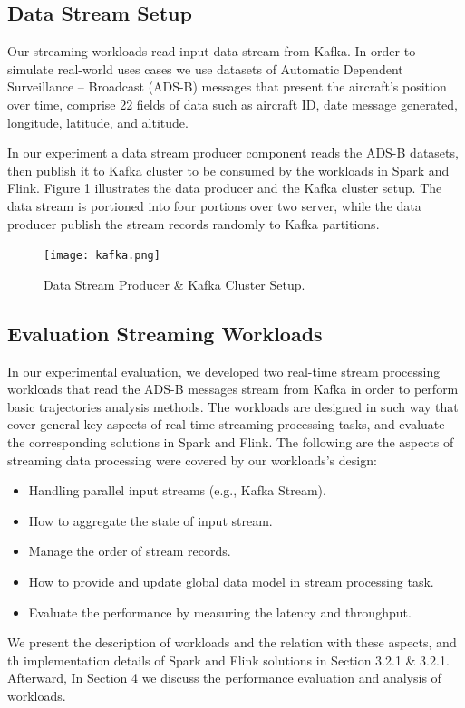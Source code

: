 \documentclass[]{article}
\begin{document}
\subsection{Data Stream Setup}
Our streaming workloads read input data stream from Kafka. In order to simulate real-world uses cases we use datasets of Automatic Dependent Surveillance – Broadcast (ADS-B) messages that present the aircraft's position over time, comprise 22 fields of data such as aircraft ID, date message generated, longitude, latitude, and altitude.
\par In our experiment a data stream producer component reads the ADS-B datasets, then publish it to Kafka cluster to be consumed by the workloads in Spark and Flink. Figure 1 illustrates the data producer and the Kafka cluster setup.
The data stream is portioned into four portions over two server, while the data producer publish the stream records randomly to Kafka partitions.

\begin{figure}[h]
 
  \centering
    \texttt{[image: kafka.png]}
     \caption{Data Stream Producer \& Kafka Cluster Setup.}
\end{figure} 

\subsection{Evaluation Streaming Workloads}
In our experimental evaluation, we developed two real-time stream processing workloads that read the ADS-B messages stream from Kafka in order to perform basic trajectories analysis methods. The workloads are designed in such way that cover general key aspects of real-time streaming processing tasks, and evaluate the corresponding solutions in Spark and Flink. The following are the aspects of streaming data processing were covered by our workloads's design: 

\begin{itemize}
\item Handling parallel input streams (e.g., Kafka Stream).
\item How to aggregate the state of input stream.
\item Manage the order of stream records.
\item How to provide and update global data model in stream processing task.
\item Evaluate the performance by measuring  the latency and throughput.
\end{itemize}
We present the description of workloads and the relation with these aspects, and th implementation details of Spark and Flink solutions in Section 3.2.1 \& 3.2.1. Afterward, In Section 4 we discuss the performance evaluation and analysis of workloads.
\end{document}
